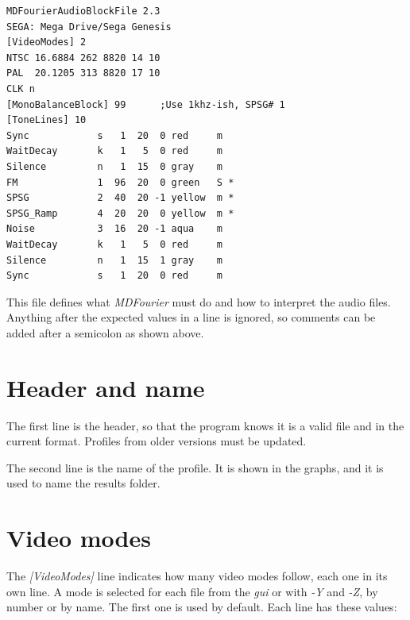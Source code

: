 \documentclass[10pt,a4paper]{report}
\newcommand{\ac}[1]{\textit{\mbox{\acrshort{#1}}}}
\begin{document}
\begin{appendices}
\begin{verbatim}
MDFourierAudioBlockFile 2.3
SEGA: Mega Drive/Sega Genesis
[VideoModes] 2
NTSC 16.6884 262 8820 14 10
PAL  20.1205 313 8820 17 10
CLK n
[MonoBalanceBlock] 99      ;Use 1khz-ish, SPSG# 1
[ToneLines] 10
Sync            s   1  20  0 red     m
WaitDecay       k   1   5  0 red     m
Silence         n   1  15  0 gray    m
FM              1  96  20  0 green   S *
SPSG            2  40  20 -1 yellow  m *
SPSG_Ramp       4  20  20  0 yellow  m *
Noise           3  16  20 -1 aqua    m
WaitDecay       k   1   5  0 red     m
Silence         n   1  15  1 gray    m
Sync            s   1  20  0 red     m
\end{verbatim}

This file defines what \textit{MDFourier} must do and how to interpret the audio files. Anything after the expected values in a line is ignored, so comments can be added after a semicolon as shown above.

\section{Header and name}

The first line is the header, so that the program knows it is a valid file and in the current format. Profiles from older versions must be updated.

The second line is the name of the profile. It is shown in the graphs, and it is used to name the results folder.

\section{Video modes}

The \textit{[VideoModes]} line indicates how many video modes follow, each one in its own line. A mode is selected for each file from the \ac{gui} or with \textit{-Y} and \textit{-Z}, by number or by name. The first one is used by default. Each line has these values:


\end{appendices}
\end{document}
